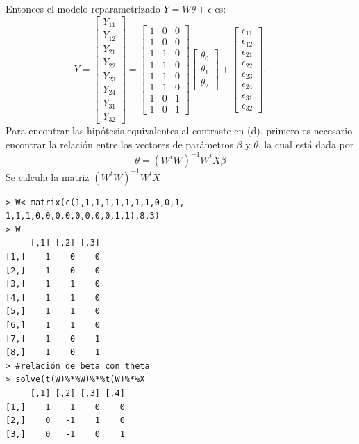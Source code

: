 \documentclass[12pt,a4paper]{report}
\begin{document}
\begin{itemize}
Entonces el modelo reparametrizado $Y = W\theta + \epsilon$ es:
\[
Y=\begin{bmatrix} Y_{11} \\ 
Y_{12} \\ Y_{21} \\ Y_{22} \\ Y_{23} \\ Y_{24} \\ Y_{31} \\ Y_{32}
\end{bmatrix} =
\begin{bmatrix}
1 & 0 & 0 \\
1 & 0 & 0 \\
1 & 1 & 0 \\
1 & 1 & 0 \\
1 & 1 & 0 \\
1 & 1 & 0 \\
1 & 0 & 1 \\
1 & 0 & 1
\end{bmatrix}
\begin{bmatrix}
\theta_0 \\ \theta_1 \\ \theta_2 \end{bmatrix} + \begin{bmatrix} 
\epsilon_{11} \\ \epsilon_{12} \\ \epsilon_{21} \\ \epsilon_{22} \\ \epsilon_{23} \\ \epsilon_{24} \\ \epsilon_{31} \\ \epsilon_{32}
\end{bmatrix} , \qquad 
\]
Para encontrar las hipótesis equivalentes al contraste en (d), primero es necesario encontrar la relación entre los vectores de parámetros $\beta$ y $\theta$, la cual está dada por
\[\theta=(W^tW)^{-1}W^tX\beta \]
\newpage
Se calcula la matriz $(W^tW)^{-1}W^tX$\\
\begin{verbatim}
> W<-matrix(c(1,1,1,1,1,1,1,1,0,0,1,
1,1,1,0,0,0,0,0,0,0,0,1,1),8,3)
> W
     [,1] [,2] [,3]
[1,]    1    0    0
[2,]    1    0    0
[3,]    1    1    0
[4,]    1    1    0
[5,]    1    1    0
[6,]    1    1    0
[7,]    1    0    1
[8,]    1    0    1
> #relación de beta con theta
> solve(t(W)%*%W)%*%t(W)%*%X
     [,1] [,2] [,3] [,4]
[1,]    1    1    0    0
[2,]    0   -1    1    0
[3,]    0   -1    0    1
\end{verbatim}



\end{itemize}
\end{document}
